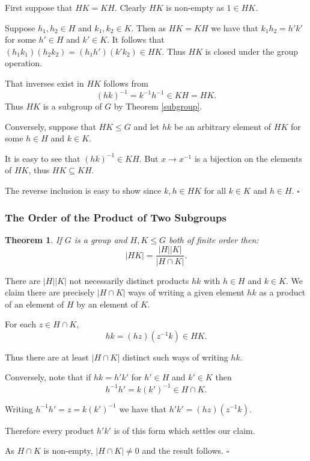 \documentclass[10pt]{article}
\newtheorem{theorem}{Theorem}[section]
\newenvironment{proof}[1][Proof]{\begin{trivlist}
\item[\hskip \labelsep {\itshape #1}]}{\end{trivlist}}
\begin{document}
\begin{proof}
First suppose that $HK = KH$. Clearly $HK$ is non-empty as $1 \in HK$.

Suppose $h_1, h_2 \in H$ and $k_1, k_2 \in K$. Then as $HK = KH$ we have that $k_1h_2 = h'k'$ for some $h' \in H$ and $k' \in K$. It follows that
$(h_1k_1)(h_2k_2) = (h_1h')(k'k_2) \in HK$. Thus $HK$ is closed under the group operation.

That inverses exist in $HK$ follows from
$$(hk)^{-1} = k^{-1}h^{-1} \in KH = HK.$$
Thus $HK$ is a subgroup of $G$ by Theorem \ref{subgroup}.

Conversely, suppose that $HK \leq G$ and let $hk$ be an arbitrary element of $HK$ for some $h \in H$ and $k \in K$.

It is easy to see that $(hk)^{-1} \in KH$. But $x \to x^{-1}$ is a bijection on the elements of $HK$, thus $HK \subseteq KH$.

The reverse inclusion is easy to show since $k, h \in HK$ for all $k \in K$ and $h \in H$. $\square$
\end{proof}

\subsubsection{The Order of the Product of Two Subgroups}

\begin{theorem}
If $G$ is a group and $H, K \leq G$ both of finite order then:
$$|HK| = \frac{|H||K|}{|H\cap K|}.$$
\end{theorem}

\begin{proof}
There are $|H||K|$ not necessarily distinct products $hk$ with $h \in H$ and $k \in K$. We claim there are precisely $|H\cap K|$ ways of writing a given element $hk$ as a product of an element of $H$ by an element of $K$.

For each $z \in H\cap K,$
$$hk = (hz)(z^{-1}k) \in HK.$$

Thus there are at least $|H\cap K|$ distinct such ways of writing $hk$.

Conversely, note that if $hk = h'k'$ for $h' \in H$ and $k' \in K$ then
$$h^{-1}h' = k(k')^{-1} \in H\cap K.$$

Writing $h^{-1}h' = z = k(k')^{-1}$ we have that $h'k' = (hz)(z^{-1}k)$.

Therefore every product $h'k'$ is of this form which settles our claim.

As $H\cap K$ is non-empty, $|H\cap K| \neq 0$ and the result follows. $\square$
\end{proof}
\end{document}
